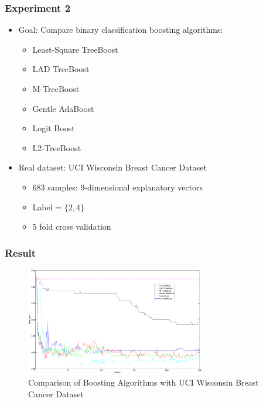 \documentclass[]{beamer}
\begin{document}
\begin{frame}
	\frametitle{Experiment 2}
	\begin{itemize}
		\item Goal: Compare binary classification boosting algorithms:
			\begin{itemize}
				\item Least-Square TreeBoost
				\item LAD TreeBoost
				\item M-TreeBoost
				\item Gentle AdaBoost
				\item Logit Boost
				\item L2-TreeBoost
			\end{itemize}

		\item Real dataset: UCI Wisconsin Breast Cancer Dataset
			\begin{itemize}
				\item 683 samples: 9-dimensional explanatory vectors
				\item Label = $\{2, 4\}$
				\item 5 fold cross validation
			\end{itemize}
	\end{itemize}
\end{frame}
\begin{frame}
	\frametitle{Result}
	\begin{figure}
		\centering
		\caption{Comparison of Boosting Algorithms with UCI Wisconsin Breast Cancer Dataset}
		\includegraphics[width = 0.7\textwidth]{Figures/wbc.eps}
	\end{figure}
\end{frame}

\end{document}
